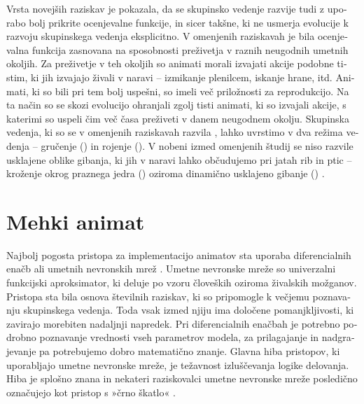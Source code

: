 \begin{slovenian}
Vrsta novejših raziskav \cite{biswas2014causes,hein2015evolution,olson2013predator,olson2015exploring,olson2016evolution,witkowski2016emergence} je pokazala, da se skupinsko vedenje razvije tudi z uporabo bolj prikrite ocenjevalne funkcije, in sicer takšne, ki ne usmerja evolucije k razvoju skupinskega vedenja eksplicitno. V omenjenih raziskavah je bila ocenjevalna funkcija zasnovana na sposobnosti preživetja v raznih neugodnih umetnih okoljih. Za preživetje v teh okoljih so animati morali izvajati akcije podobne tistim, ki jih izvajajo živali v naravi -- izmikanje plenilcem, iskanje hrane, itd. Animati, ki so bili pri tem bolj uspešni, so imeli več priložnosti za reprodukcijo. Na ta način so se skozi evolucijo ohranjali zgolj tisti animati, ki so izvajali akcije, s katerimi so uspeli čim več časa preživeti v danem neugodnem okolju. Skupinska vedenja, ki so se v omenjenih raziskavah razvila \cite{biswas2014causes,hein2015evolution,olson2013predator,olson2015exploring,olson2016evolution,witkowski2016emergence}, lahko uvrstimo v dva režima vedenja -- gručenje () in rojenje (). V nobeni izmed omenjenih študij se niso razvile usklajene oblike gibanja, ki jih v naravi lahko občudujemo pri jatah rib in ptic -- kroženje okrog praznega jedra () oziroma dinamično usklajeno gibanje () \cite{couzin2002collective,sumpter2006principles}.

\section{Mehki animat}

Najbolj pogosta pristopa za implementacijo animatov sta uporaba diferencialnih enačb \cite{couzin2002collective,hildenbrandt2010selforganized,reynolds1987flocks,vicsek2012collective} ali umetnih nevronskih mrež \cite{kunz2006prey,witkowski2016emergence,zaera1996not}. Umetne nevronske mreže so univerzalni funkcijski aproksimator, ki deluje po vzoru človeških oziroma živalskih možganov. Pristopa sta bila osnova številnih raziskav, ki so pripomogle k večjemu poznavanju skupinskega vedenja. Toda vsak izmed njiju ima določene pomanjkljivosti, ki zavirajo morebiten nadaljnji napredek. Pri diferencialnih enačbah je potrebno podrobno poznavanje vrednosti vseh parametrov modela, za prilagajanje in nadgrajevanje pa potrebujemo dobro matematično znanje. Glavna hiba pristopov, ki uporabljajo umetne nevronske mreže, je težavnost izluščevanja logike delovanja. Hiba je splošno znana in nekateri raziskovalci umetne nevronske mreže posledično označujejo kot pristop s »črno škatlo« \cite{paruelo1997prediction,lek1999artificial,ozesmi1999artificial}.


\end{slovenian}
